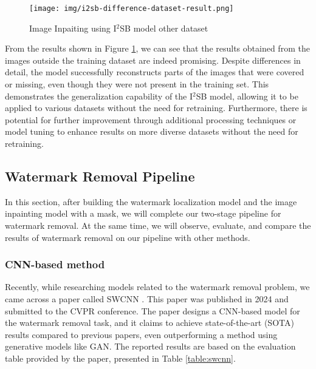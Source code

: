 \begin{figure}[t]
    \centering
    \texttt{[image: img/i2sb-difference-dataset-result.png]}
    \caption[Image Inpaiting using I$^2$SB model with random dataset]{Image Inpaiting using I$^2$SB model other dataset}
    \label{fig:i2sb-difference-dataset-result}
\end{figure}

From the results shown in Figure \ref{fig:i2sb-difference-dataset-result}, we can see that the results obtained from the images outside the training dataset are indeed promising. Despite differences in detail, the model successfully reconstructs parts of the images that were covered or missing, even though they were not present in the training set. This demonstrates the generalization capability of the I$^2$SB model, allowing it to be applied to various datasets without the need for retraining. Furthermore, there is potential for further improvement through additional processing techniques or model tuning to enhance results on more diverse datasets without the need for retraining.

\subsection{Watermark Removal Pipeline}
In this section, after building the watermark localization model and the image inpainting model with a mask, we will complete our two-stage pipeline for watermark removal. At the same time, we will observe, evaluate, and compare the results of watermark removal on our pipeline with other methods.
\subsubsection{CNN-based method}

Recently, while researching models related to the watermark removal problem, we came across a paper called SWCNN \cite{2024swcnn}. This paper was published in 2024 and submitted to the CVPR conference. The paper designs a CNN-based model for the watermark removal task, and it claims to achieve state-of-the-art (SOTA) results compared to previous papers, even outperforming a method using generative models like GAN. The reported results are based on the evaluation table provided by the paper, presented in Table \ref{table:swcnn}.

